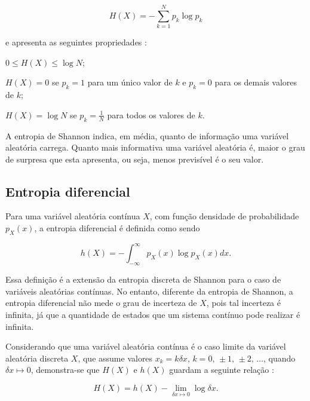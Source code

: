 \begin{equation}\label{eq:Shannon}
H(X) = -\sum\limits_{k = 1}^N p_k\log{p_k}
\end{equation}

e apresenta as seguintes propriedades \cite{Thomas:2006}:

\begin{alineas}
\item $0 \leq H(X) \leq \log{N}$;  
\item $H(X) = 0$ se $p_k = 1$ para um único valor de $k$ e $p_k = 0$ para os demais valores de $k$;
\item $H(X) = \log{N}$ se $p_k = \frac{1}{N}$ para todos os valores de $k$.
\end{alineas}

A entropia de Shannon indica, em média, quanto de informação uma variável aleatória carrega. Quanto mais informativa uma variável aleatória é, maior o grau de surpresa que esta apresenta, ou seja, menos previsível é o seu valor.

\subsection{Entropia diferencial}

Para uma variável aleatória contínua $X$, com função densidade de probabilidade $p_X(x)$, a entropia diferencial é definida como sendo \cite{Thomas:2006}

\begin{equation}\label{eq:difent}
h(X) = -\int_{-\infty}^\infty p_X(x)\log{p_X(x)}dx\text{.}
\end{equation}

Essa definição é a extensão da entropia discreta de Shannon para o caso de variáveis aleatórias contínuas. No entanto, diferente da entropia de Shannon, a entropia diferencial não mede o grau de incerteza de $X$, pois tal incerteza é infinita, já que a quantidade de estados que um sistema contínuo pode realizar é infinita.

Considerando que uma variável aleatória contínua é o caso limite da variável aleatória discreta $X$, que assume valores $x_k = k \delta x$, $k = 0\text{, }\pm 1\text{, } \pm 2\text{, }\ldots$, quando $\delta x \mapsto 0$, demonstra-se que $H(X)$ e $h(X)$ guardam a seguinte relação \cite{Thomas:2006}:

\begin{equation} \label{eq:entropias}
H(X) = h(X) - \lim_{\delta x \mapsto 0}{\log{\delta x}}\text{.}
\end{equation}


